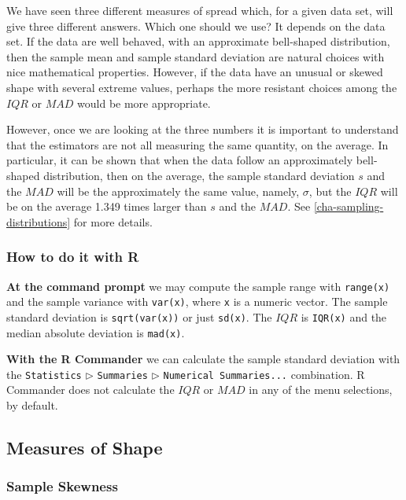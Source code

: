 \documentclass[]{book}
\numberwithin{equation}{chapter}
\numberwithin{figure}{chapter}
\theoremstyle{plain}
\theoremstyle{definition}
\theoremstyle{remark}
\theoremstyle{definition}
\theoremstyle{definition}
\theoremstyle{remark}
\begin{document}
We have seen three different measures of spread which, for a given data
set, will give three different answers. Which one should we use? It
depends on the data set. If the data are well behaved, with an
approximate bell-shaped distribution, then the sample mean and sample
standard deviation are natural choices with nice mathematical
properties. However, if the data have an unusual or skewed shape with
several extreme values, perhaps the more resistant choices among the
\(IQR\) or \(MAD\) would be more appropriate.

However, once we are looking at the three numbers it is important to
understand that the estimators are not all measuring the same quantity,
on the average. In particular, it can be shown that when the data follow
an approximately bell-shaped distribution, then on the average, the
sample standard deviation \(s\) and the \(MAD\) will be the
approximately the same value, namely, \(\sigma\), but the \(IQR\) will
be on the average 1.349 times larger than \(s\) and the \(MAD\). See
\ref{cha-sampling-distributions} for more details.

\subsubsection{How to do it with R}\label{how-to-do-it-with-r-2}

\textbf{At the command prompt} we may compute the sample range with
\texttt{range(x)} and the sample variance with \texttt{var(x)}, where
\texttt{x} is a numeric vector. The sample standard deviation is
\texttt{sqrt(var(x))} or just \texttt{sd(x)}. The \(IQR\) is
\texttt{IQR(x)} and the median absolute deviation is \texttt{mad(x)}.

\textbf{With the R Commander} we can calculate the sample standard
deviation with the \texttt{Statistics} \(\triangleright\)
\texttt{Summaries} \(\triangleright\) \texttt{Numerical\ Summaries...}
combination. R Commander does not calculate the \(IQR\) or \(MAD\) in
any of the menu selections, by default.

\subsection{Measures of Shape}\label{sub-measures-of-shape}

\subsubsection{Sample Skewness}\label{sample-skewness}
\end{document}
